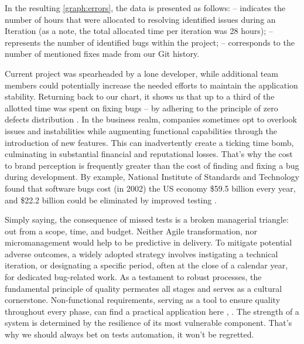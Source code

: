 \noindent In the resulting \cref{graph:errors}, the data is presented as follows:
 -- indicates the number of hours that were allocated to resolving identified issues during an Iteration (as a 
note, the total allocated time per iteration was 28 hours);
 -- represents the number of identified bugs within the project;
 -- corresponds to the number of mentioned fixes made from our Git history.

Current project was spearheaded by a lone developer, while additional team members could potentially increase 
the needed efforts \cite{Alm21} to maintain the application stability. Returning back to our chart, it shows us 
that up to a third of the allotted time was spent on fixing bugs -- by adhering to the principle of zero 
defects distribution \cite{Allan98}. In the business realm, companies sometimes opt to overlook issues and instabilities 
while augmenting functional capabilities through the introduction of new features. This can inadvertently create a ticking 
time bomb, culminating in substantial financial and reputational losses. That's why the cost to brand perception is 
frequently greater than the cost of finding and fixing a bug during development. By example, National Institute of 
Standards and Technology found that software bugs cost (in 2002) the US economy \$59.5 billion every year, and 
\$22.2 billion could be eliminated by improved testing \cite{RTI02}.

Simply saying, the consequence of missed tests is a broken managerial triangle: out from a scope, time, and budget.
Neither Agile transformation, nor micromanagement would help to be predictive in delivery. To mitigate potential adverse 
outcomes, a widely adopted strategy involves instigating a technical iteration, or designating a specific period, often 
at the close of a calendar year, for dedicated bug-related work. As a testament to robust processes, the fundamental 
principle of quality permeates all stages and serves as a cultural cornerstone. Non-functional requirements, serving 
as a tool to ensure quality throughout every phase, can find a practical application here \cite{Sam17}, \cite{Suz12}. 
The strength of a system is determined by the resilience of its most vulnerable component. That's why we should always 
bet on tests automation, it won't be regretted.

